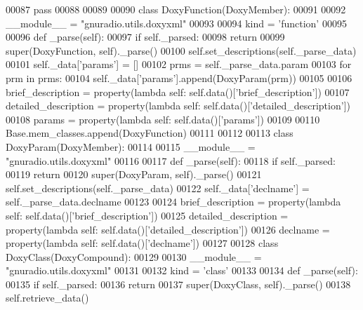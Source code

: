 \begin{DoxyCode}
{00087     \textcolor{keywordflow}{pass}
00088 
00089 
00090 \textcolor{keyword}{class }DoxyFunction(DoxyMember):
00091 
00092     \_\_module\_\_ = \textcolor{stringliteral}{"gnuradio.utils.doxyxml"}
00093 
00094     kind = \textcolor{stringliteral}{'function'}
00095 
00096     \textcolor{keyword}{def }_parse(self):
00097         \textcolor{keywordflow}{if} self.\_parsed:
00098             \textcolor{keywordflow}{return}
00099         super(DoxyFunction, self)._parse()
00100         self.set_descriptions(self.\_parse\_data)
00101         self.\_data[\textcolor{stringliteral}{'params'}] = []
00102         prms = self.\_parse\_data.param
00103         \textcolor{keywordflow}{for} prm \textcolor{keywordflow}{in} prms:
00104             self.\_data[\textcolor{stringliteral}{'params'}].append(DoxyParam(prm))
00105 
00106     brief\_description = property(\textcolor{keyword}{lambda} self: self.data()[\textcolor{stringliteral}{'brief\_description'}])
00107     detailed\_description = property(\textcolor{keyword}{lambda} self: self.data()[\textcolor{stringliteral}{'detailed\_description'}])
00108     params = property(\textcolor{keyword}{lambda} self: self.data()[\textcolor{stringliteral}{'params'}])
00109 
00110 Base.mem\_classes.append(DoxyFunction)
00111 
00112 
00113 \textcolor{keyword}{class }DoxyParam(DoxyMember):
00114 
00115     \_\_module\_\_ = \textcolor{stringliteral}{"gnuradio.utils.doxyxml"}
00116 
00117     \textcolor{keyword}{def }_parse(self):
00118         \textcolor{keywordflow}{if} self.\_parsed:
00119             \textcolor{keywordflow}{return}
00120         super(DoxyParam, self)._parse()
00121         self.set_descriptions(self.\_parse\_data)
00122         self.\_data[\textcolor{stringliteral}{'declname'}] = self.\_parse\_data.declname
00123 
00124     brief\_description = property(\textcolor{keyword}{lambda} self: self.data()[\textcolor{stringliteral}{'brief\_description'}])
00125     detailed\_description = property(\textcolor{keyword}{lambda} self: self.data()[\textcolor{stringliteral}{'detailed\_description'}])
00126     declname = property(\textcolor{keyword}{lambda} self: self.data()[\textcolor{stringliteral}{'declname'}])
00127 
00128 \textcolor{keyword}{class }DoxyClass(DoxyCompound):
00129 
00130     \_\_module\_\_ = \textcolor{stringliteral}{"gnuradio.utils.doxyxml"}
00131 
00132     kind = \textcolor{stringliteral}{'class'}
00133 
00134     \textcolor{keyword}{def }_parse(self):
00135         \textcolor{keywordflow}{if} self.\_parsed:
00136             \textcolor{keywordflow}{return}
00137         super(DoxyClass, self)._parse()
00138         self.retrieve\_data()
}
\end{DoxyCode}
